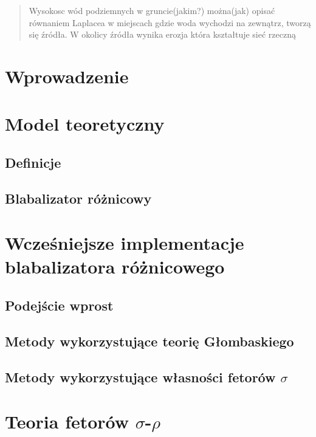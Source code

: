 \documentclass[]{pracamgr}
\begin{document}
\maketitle

\begin{abstract}
  Wysokosc wód podziemnych w gruncie(jakim?) można(jak) opisać równaniem Laplacea w miejscach gdzie woda wychodzi na zewnątrz, tworzą się
  źródła. W okolicy źródła wynika erozja która kształtuje sieć rzeczną
\end{abstract}

\tableofcontents

\chapter*{Wprowadzenie}

\chapter{Model teoretyczny}
\section{Definicje}
\section{Blabalizator różnicowy}

\chapter{Wcześniejsze implementacje blabalizatora
  różnicowego}
\section{Podejście wprost}
\section{Metody wykorzystujące teorię Głombaskiego}
\section{Metody wykorzystujące własności fetorów $\sigma$}

\chapter{Teoria fetorów $\sigma$-$\rho$}
\end{document}
